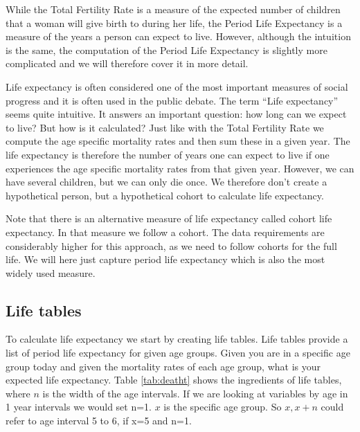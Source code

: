 \documentclass[
]{book}
\begin{document}
While the Total Fertility Rate is a measure of the expected number of children that a woman will give birth to during her life, the Period Life Expectancy is a measure of the years a person can expect to live. However, although the intuition is the same, the computation of the Period Life Expectancy is slightly more complicated and we will therefore cover it in more detail.

Life expectancy is often considered one of the most important measures of social progress and it is often used in the public debate. The term ``Life expectancy'' seems quite intuitive. It answers an important question: how long can we expect to live? But how is it calculated? Just like with the Total Fertility Rate we compute the age specific mortality rates and then sum these in a given year. The life expectancy is therefore the number of years one can expect to live if one experiences the age specific mortality rates from that given year. However, we can have several children, but we can only die once. We therefore don't create a hypothetical person, but a hypothetical cohort to calculate life expectancy.

Note that there is an alternative measure of life expectancy called cohort life expectancy. In that measure we follow a cohort. The data requirements are considerably higher for this approach, as we need to follow cohorts for the full life. We will here just capture period life expectancy which is also the most widely used measure.

\hypertarget{life-tables}{%
\subsection{Life tables}\label{life-tables}}

To calculate life expectancy we start by creating life tables. Life tables provide a list of period life expectancy for given age groups. Given you are in a specific age group today and given the mortality rates of each age group, what is your expected life expectancy. Table \ref{tab:deatht} shows the ingredients of life tables, where \(n\) is the width of the age intervals. If we are looking at variables by age in 1 year intervals we would set n=1. \(x\) is the specific age group. So \(x,x+n\) could refer to age interval 5 to 6, if x=5 and n=1.
\end{document}
